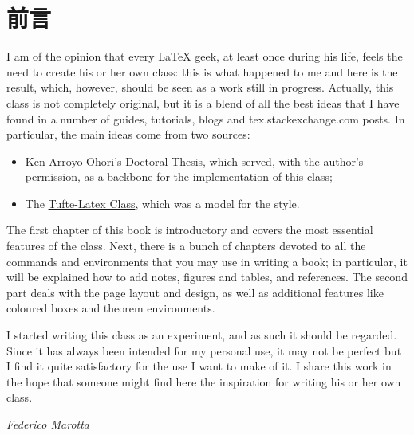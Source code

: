 \chapter*{前言}

I am of the opinion that every \LaTeX\xspace geek, at least once during
his life, feels the need to create his or her own class: this is what
happened to me and here is the result, which, however, should be seen as
a work still in progress. Actually, this class is not completely
original, but it is a blend of all the best ideas that I have found in a
number of guides, tutorials, blogs and tex.stackexchange.com posts. In
particular, the main ideas come from two sources:

\begin{itemize}
	\item \href{https://3d.bk.tudelft.nl/ken/en/}{Ken Arroyo Ohori}'s
	\href{https://3d.bk.tudelft.nl/ken/en/nl/ken/en/2016/04/17/a-1.5-column-layout-in-latex.html}{Doctoral
	Thesis}, which served, with the author's permission, as a backbone
	for the implementation of this class;
	\item The
		\href{https://github.com/Tufte-LaTeX/tufte-latex}{Tufte-Latex
			Class}, which was a model for the style.
\end{itemize}

The first chapter of this book is introductory and covers the most
essential features of the class. Next, there is a bunch of chapters
devoted to all the commands and environments that you may use in writing
a book; in particular, it will be explained how to add notes, figures
and tables, and references. The second part deals with the page layout
and design, as well as additional features like coloured boxes and
theorem environments.

I started writing this class as an experiment, and as such it should be
regarded. Since it has always been intended for my personal use, it may
not be perfect but I find it quite satisfactory for the use I want to
make of it. I share this work in the hope that someone might find here
the inspiration for writing his or her own class.

\begin{flushright}
	\textit{Federico Marotta}
\end{flushright}

